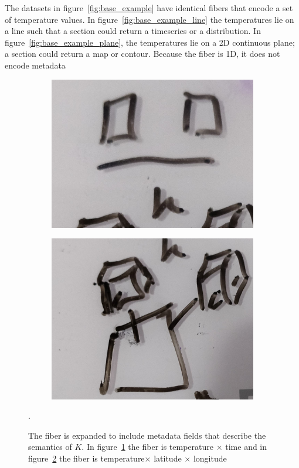 \documentclass[../main.tex]{subfiles}
\begin{document}
The datasets in figure~\ref{fig:base_example} have identical fibers that encode a set of temperature values. In figure~\ref{fig:base_example_line} the temperatures lie on a line such that a section could return a timeseries or a distribution. In figure~\ref{fig:base_example_plane}, the temperatures lie on a 2D continuous plane; a section could return a map or contour. Because the fiber is 1D, it does not encode metadata 

\begin{figure}[h!]
    \begin{subfigure}{.5\textwidth}
        \includegraphics[width=\textwidth]{figures/math/temp_2f.png}
        \label{fig:fiber_example_plane}
    \end{subfigure}
    \begin{subfigure}{.5\textwidth}
        \includegraphics[width=\textwidth]{figures/math/temp_3f.png}
        \label{fig:fiber_example_cube}
    \end{subfigure}
    \label{fig:fiber_example}
    \caption{The fiber is expanded to include metadata fields that describe the semantics of $K$. In figure~\ref{fig:fiber_example_plane} the fiber is \textrm{temperature} $\times$ \textrm{time} and in figure~\ref{fig:fiber_example_cube} the fiber is \textrm{temperature}$\times$ \textrm{latitude} $\times$ {longitude}}.
\end{figure}
\end{document}
